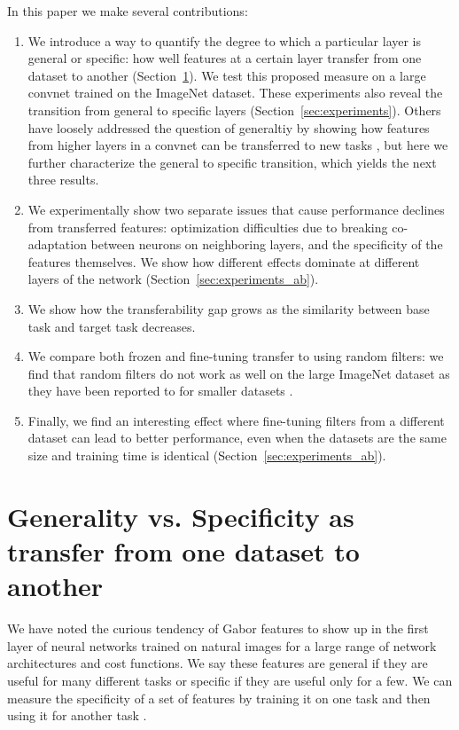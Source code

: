 In this paper we make several contributions:

\begin{enumerate}
\item We introduce a way to quantify the degree to which a particular layer is general or specific: how well features at a certain layer transfer from one dataset to another (Section~\ref{sec:definition}). We test this proposed measure on a large convnet trained on the ImageNet dataset. These experiments also reveal the transition from general to specific layers (Section~\ref{sec:experiments}).
Others have loosely addressed the question of generaltiy by showing how features from higher layers in a convnet can be transferred to new tasks \citep{donahue+jia-2013-arxiv}, but here we further characterize the general to specific transition, which yields the next three results.
\item We experimentally show two separate issues that cause performance declines from transferred features: optimization difficulties due to breaking co-adaptation between neurons on neighboring layers, and the specificity of the features themselves. We show how different effects dominate at different layers of the network (Section~\ref{sec:experiments_ab}).
\item We show how the transferability gap grows as the similarity between base
task and target task decreases. 
\item We compare both frozen and fine-tuning transfer to using random filters: we find that random filters do not work as well on the large ImageNet dataset as they have been reported to for smaller datasets \citep{Jarrett-ICCV2009}.
\item Finally, we find an interesting effect where fine-tuning filters from a different dataset can lead to better performance, even when the datasets are the same size and training time is identical (Section~\ref{sec:experiments_ab}).
\end{enumerate}






\section{Generality vs. Specificity as transfer from one dataset to another}
\label{sec:definition}

We have noted the curious tendency of Gabor features to show up in the first layer of neural networks trained on natural images for a large range of network architectures and cost functions. We say these features are general if they are useful for many different tasks or specific if they are useful only for a few. We can measure the specificity of a set of features by training it on one task \dA and then using it for another task \dB.

